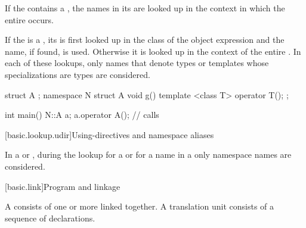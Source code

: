 \pnum
If the  contains a
, the names in its
 are looked up in the context in which the
entire  occurs.

\pnum
If the  is a ,
its 
is first looked up in the class of the object expression and the name, if
found, is used. Otherwise it is looked up in the context
of the entire .
In each of these lookups, only names that denote types or templates whose
specializations are types are considered.
\begin{example}
\begin{codeblock}
struct A { };
namespace N {
  struct A {
    void g() { }
    template <class T> operator T();
  };
}

int main() {
  N::A a;
  a.operator A();               // calls 
}
\end{codeblock}
\end{example}

[basic.lookup.udir]{Using-directives and namespace aliases}

\pnum
{}%
%
In a  or ,
during the lookup for a  or for a name in a
only namespace names are considered.%
%

[basic.link]{Program and linkage}%

\pnum
{}%
A  consists of one or more 
linked together. A translation unit consists
of a sequence of declarations.

\begin{bnf}
\br
\end{bnf}

